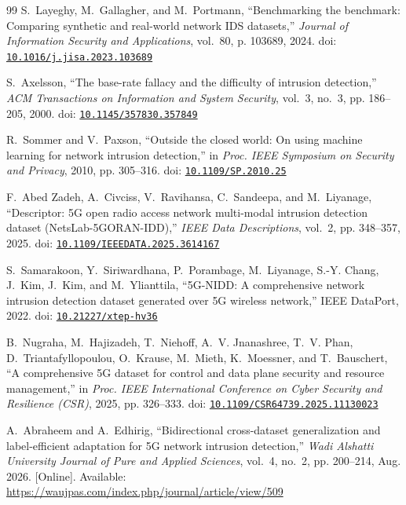 \begin{thebibliography}{99}
S.~Layeghy, M.~Gallagher, and M.~Portmann, ``Benchmarking the benchmark:
  Comparing synthetic and real-world network {IDS} datasets,'' \emph{Journal of
  Information Security and Applications}, vol.~80, p. 103689, 2024. doi:
  \href{https://doi.org/10.1016/j.jisa.2023.103689}{\nolinkurl{10.1016/j.jisa.2023.103689}}

S.~Axelsson, ``The base-rate fallacy and the difficulty of intrusion
  detection,'' \emph{ACM Transactions on Information and System Security},
  vol.~3, no.~3, pp. 186--205, 2000. doi:
  \href{https://doi.org/10.1145/357830.357849}{\nolinkurl{10.1145/357830.357849}}

R.~Sommer and V.~Paxson, ``Outside the closed world: On using machine learning
  for network intrusion detection,'' in \emph{Proc. IEEE Symposium on Security
  and Privacy}, 2010, pp. 305--316. doi:
  \href{https://doi.org/10.1109/SP.2010.25}{\nolinkurl{10.1109/SP.2010.25}}

F.~{Abed Zadeh}, A.~Civciss, V.~Ravihansa, C.~Sandeepa, and M.~Liyanage,
  ``Descriptor: {5G} open radio access network multi-modal intrusion detection
  dataset ({NetsLab-5GORAN-IDD}),'' \emph{IEEE Data Descriptions}, vol.~2, pp.
  348--357, 2025. doi:
  \href{https://doi.org/10.1109/IEEEDATA.2025.3614167}{\nolinkurl{10.1109/IEEEDATA.2025.3614167}}

S.~Samarakoon, Y.~Siriwardhana, P.~Porambage, M.~Liyanage, S.-Y. Chang, J.~Kim,
  J.~Kim, and M.~Ylianttila, ``{5G-NIDD}: A comprehensive network intrusion
  detection dataset generated over {5G} wireless network,'' IEEE DataPort,
  2022. doi:
  \href{https://doi.org/10.21227/xtep-hv36}{\nolinkurl{10.21227/xtep-hv36}}

B.~Nugraha, M.~Hajizadeh, T.~Niehoff, A.~V. Jnanashree, T.~V. Phan,
  D.~Triantafyllopoulou, O.~Krause, M.~Mieth, K.~Moessner, and T.~Bauschert,
  ``A comprehensive {5G} dataset for control and data plane security and
  resource management,'' in \emph{Proc. IEEE International Conference on Cyber
  Security and Resilience (CSR)}, 2025, pp. 326--333. doi:
  \href{https://doi.org/10.1109/CSR64739.2025.11130023}{\nolinkurl{10.1109/CSR64739.2025.11130023}}

\BIBentryALTinterwordspacing
A.~Abraheem and A.~Edhirig, ``Bidirectional cross-dataset generalization and
  label-efficient adaptation for {5G} network intrusion detection,'' \emph{Wadi
  Alshatti University Journal of Pure and Applied Sciences}, vol.~4, no.~2, pp.
  200--214, Aug. 2026. [Online]. Available:
  \url{https://waujpas.com/index.php/journal/article/view/509}
\BIBentrySTDinterwordspacing


\end{thebibliography}
